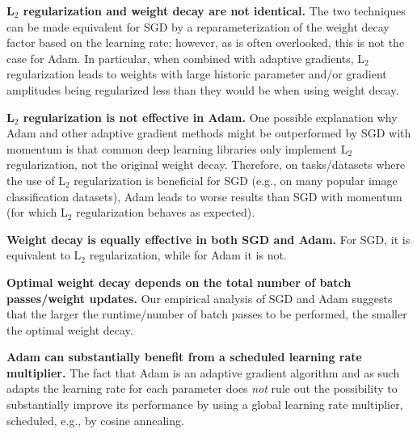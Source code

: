 \documentclass[usenames,dvipsnames]{article} %
\begin{document}
\begin{description}
	\item \textbf{L$_2$ regularization and weight decay are not identical.} The two techniques can be made equivalent for SGD by a reparameterization of the weight decay factor based on the learning rate; however, as is often overlooked, this is not the case for Adam. 
In particular, when combined with adaptive gradients, L$_2$ regularization leads to weights with large historic parameter and/or gradient amplitudes being regularized less than they would be when using weight decay.

	\item \textbf{L$_2$ regularization is not effective in Adam.} One possible explanation why Adam and other adaptive gradient methods might be outperformed by SGD with momentum is that common deep learning libraries only implement L$_2$ regularization, not the original weight decay. Therefore, on tasks/datasets where the use of L$_2$ regularization is beneficial for SGD (e.g., on many popular image classification datasets), Adam leads to worse results than SGD with momentum (for which L$_2$ regularization behaves as expected). 
    
	\item \textbf{Weight decay
    is equally effective in both SGD and Adam.} For SGD, it is equivalent to L$_2$ regularization, while for Adam it is not.
    
	\item \textbf{Optimal weight decay depends on the total number of batch passes/weight updates.} Our empirical analysis of SGD and Adam suggests that the larger the runtime/number of batch passes to be performed, the smaller the optimal weight decay. 

	\item \textbf{Adam can substantially benefit from a scheduled learning rate multiplier.}
    The fact that Adam is an adaptive gradient algorithm and as such adapts the learning rate for each parameter does \emph{not} rule out the possibility to substantially improve its performance by using a global learning rate multiplier, scheduled, e.g., by cosine annealing.
\end{description}
 
\end{document}
